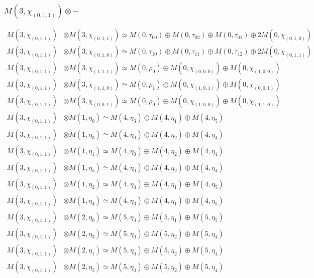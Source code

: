 \subsubsection{$ M(3,\chi_{(0,1,1)})\otimes -$}
\begin{align*}
M(3,\chi_{(0,1,1)}) &\otimes M(3,\chi_{(0,1,1)}) \simeq M(0,\tau_{00}) \oplus M(0,\tau_{02}) \oplus M(0,\tau_{01}) \oplus 2 M(0,\chi_{(0,1,0)})\\
M(3,\chi_{(0,1,1)}) &\otimes M(3,\chi_{(0,1,0)}) \simeq M(0,\tau_{10}) \oplus M(0,\tau_{11}) \oplus M(0,\tau_{12}) \oplus 2 M(0,\chi_{(0,1,1)})\\
M(3,\chi_{(0,1,1)}) &\otimes M(3,\chi_{(1,1,1)}) \simeq M(0,\rho_{0}) \oplus M(0,\chi_{(0,0,0)}) \oplus M(0,\chi_{(1,0,0)})\\
M(3,\chi_{(0,1,1)}) &\otimes M(3,\chi_{(1,1,0)}) \simeq M(0,\rho_{1}) \oplus M(0,\chi_{(1,0,1)}) \oplus M(0,\chi_{(0,0,1)})\\
M(3,\chi_{(0,1,1)}) &\otimes M(3,\chi_{(0,0,1)}) \simeq M(0,\rho_{0}) \oplus M(0,\chi_{(1,0,0)}) \oplus M(0,\chi_{(1,1,0)})\\
M(3,\chi_{(0,1,1)}) &\otimes M(1,\eta_{0}) \simeq M(4,\eta_{3}) \oplus M(4,\eta_{1}) \oplus M(4,\eta_{5})\\
M(3,\chi_{(0,1,1)}) &\otimes M(1,\eta_{3}) \simeq M(4,\eta_{0}) \oplus M(4,\eta_{2}) \oplus M(4,\eta_{4})\\
M(3,\chi_{(0,1,1)}) &\otimes M(1,\eta_{1}) \simeq M(4,\eta_{0}) \oplus M(4,\eta_{2}) \oplus M(4,\eta_{4})\\
M(3,\chi_{(0,1,1)}) &\otimes M(1,\eta_{5}) \simeq M(4,\eta_{0}) \oplus M(4,\eta_{2}) \oplus M(4,\eta_{4})\\
M(3,\chi_{(0,1,1)}) &\otimes M(1,\eta_{2}) \simeq M(4,\eta_{3}) \oplus M(4,\eta_{1}) \oplus M(4,\eta_{5})\\
M(3,\chi_{(0,1,1)}) &\otimes M(1,\eta_{4}) \simeq M(4,\eta_{3}) \oplus M(4,\eta_{1}) \oplus M(4,\eta_{5})\\
M(3,\chi_{(0,1,1)}) &\otimes M(2,\eta_{0}) \simeq M(5,\eta_{3}) \oplus M(5,\eta_{1}) \oplus M(5,\eta_{5})\\
M(3,\chi_{(0,1,1)}) &\otimes M(2,\eta_{3}) \simeq M(5,\eta_{0}) \oplus M(5,\eta_{2}) \oplus M(5,\eta_{4})\\
M(3,\chi_{(0,1,1)}) &\otimes M(2,\eta_{1}) \simeq M(5,\eta_{0}) \oplus M(5,\eta_{2}) \oplus M(5,\eta_{4})\\
M(3,\chi_{(0,1,1)}) &\otimes M(2,\eta_{5}) \simeq M(5,\eta_{0}) \oplus M(5,\eta_{2}) \oplus M(5,\eta_{4})\\

\end{align*}
